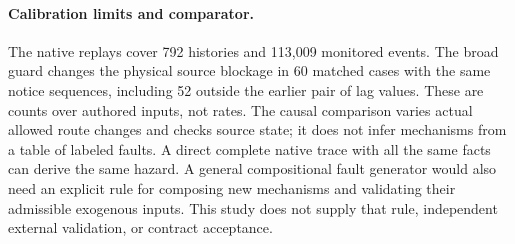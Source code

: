 \documentclass{article}
\begin{document}
\paragraph{Calibration limits and comparator.}
The native replays cover 792 histories and 113,009 monitored events. The broad guard changes the physical source blockage in 60 matched cases with the same notice sequences, including 52 outside the earlier pair of lag values. These are counts over authored inputs, not rates. The causal comparison varies actual allowed route changes and checks source state; it does not infer mechanisms from a table of labeled faults. A direct complete native trace with all the same facts can derive the same hazard. A general compositional fault generator would also need an explicit rule for composing new mechanisms and validating their admissible exogenous inputs. This study does not supply that rule, independent external validation, or contract acceptance.
\end{document}

